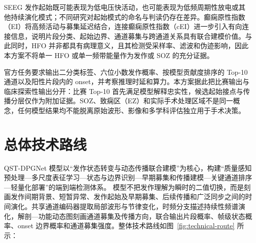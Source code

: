 \documentclass{cumcmthesis_v2}
\numberwithin{figure}{section} %
\numberwithin{table}{section} %
\begin{document}
SEEG 发作起始既可能表现为低电压快活动，也可能表现为低频周期性放电或其他持续演化模式；不同研究对起始模式的命名与判读仍存在差异\cite{abdallah_sop}。癫痫原性指数（EI）将高频活动与募集延迟结合\cite{bartolomei_ei}，连接癫痫原性指数（cEI）进一步引入有向连接信息\cite{balatskaya_cei}，说明片段分类、起始边界、通道募集与跨通道关系具有联合建模价值。与此同时，HFO 并非都具有病理意义，且其检测受采样率、滤波和伪迹影响，因此本方案不将单一 HFO 或单一频带能量作为发作或 SOZ 的充分证据\cite{hfo_review}。

官方任务要求输出二分类标签、六位小数发作概率、按模型贡献度排序的 Top-10 通道以及阳性片段内的 onset，并考察推理时延和算力\cite{competition_page}。本方案据此把比赛输出与临床探索性输出分开：比赛 Top-10 首先满足模型解释忠实性，候选起始接点与传播分层仅作为附加证据。SOZ、致痫区（EZ）和实际手术处理区域不是同一概念，任何模型结果均不能脱离原始波形、影像和多学科评估独立用于手术决策\cite{rosenow_ez}。


\section{总体技术路线}

QST-DPGNet 模型以“发作状态转变与动态传播联合建模”为核心，构建“质量感知预处理—多尺度表征学习—状态与边界识别—早期募集和传播建模—关键通道排序—轻量化部署”的端到端检测体系。
模型不把发作理解为瞬时的二值切换，而是刻画发作间期背景、短暂异常、发作起始及早期募集、后续传播和广泛同步之间的时间演化。共享通道编码器提取局部波形与节律变化，时频分支描述持续性频谱演化，解剖—功能动态图刻画通道募集及传播方向，联合输出片段概率、帧级状态概率、onset 边界概率和通道募集强度。整体技术路线如图~\ref{fig:technical-route} 所示：
\end{document}
